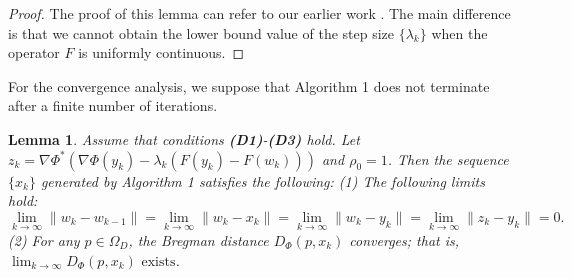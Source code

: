 \documentclass[hidelinks,11 pt]{article}
\numberwithin{equation}{section}
\newtheorem{lemma}[theorem]{Lemma}
\theoremstyle{definition}  %
\numberwithin{equation}{section}
\numberwithin{theorem}{section}
\begin{document}
\begin{proof}
The proof of this lemma can refer to our earlier work \cite{a25}. The main difference is that we cannot obtain the lower bound value of the step size $\{\lambda_{k}\}$ when the operator $F$ is uniformly continuous.
\end{proof}
For the convergence analysis, we suppose that Algorithm 1 does not terminate after a finite number of iterations. 
\begin{lemma}\label{l4.2}
Assume that conditions \textbf{(D1)}-\textbf{(D3)} hold. Let $z_k = \nabla \Phi^* \left( \nabla \Phi(y_k) - \lambda_k \left(F(y_k) - F(w_k)\right) \right)$ and $\rho_{0}=1$. Then the sequence $\{x_k\}$ generated by Algorithm 1 satisfies the following:
\vskip 2mm
(1) The following limits hold:
\[
\lim_{k \to \infty} \|w_k - w_{k-1}\| = 
\lim_{k \to \infty} \|w_k - x_k\| = 
\lim_{k \to \infty} \|w_k - y_k\| = 
\lim_{k \to \infty} \|z_k - y_k\| = 0.
\]
(2) For any $p \in \Omega_D$, the Bregman distance $D_\Phi(p, x_k)$ converges; that is,
$\lim_{k \to \infty} D_\Phi(p, x_k) \text{ exists}$.
\end{lemma}
\end{document}
